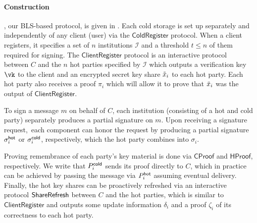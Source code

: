 
\paragraph{Construction}

\newcommand{\corrc}[1]{\textcolor{blue}{#1}}



\sysname, our BLS-based \hcwl protocol, is given in . Each cold storage is set up separately and independently of any client (user) via the $\mathsf{ColdRegister}$ protocol. When a client registers, it specifies a set of $n$ institutions $\mathcal{I}$ and a threshold $t \leq n$ of them required for signing. The $\mathsf{ClientRegister}$ protocol is an interactive protocol between $C$ and the $n$ hot parties specified by $\mathcal{I}$ which outputs a verification key $\vk$ to the client and an encrypted secret key share $\tilde{x}_i$ to each hot party. Each hot party also receives a proof $\pi_i$ which will allow it to prove that $\tilde{x}_i$ was the output of $\mathsf{ClientRegister}$.

To sign a message $m$ on behalf of $C$, each institution (consisting of a hot and cold party) separately produces a partial signature on $m$. Upon receiving a signature request,\footnotemark\ each component can honor the request by producing a partial signature $\sigma_i^{\mathsf{hot}}$ or $\sigma_i^{\mathsf{cold}}$, respectively, which the hot party combines into $\sigma_i$.

Proving remembrance of each party's key material is done via $\mathsf{CProof}$ and $\mathsf{HProof}$, respectively. We write that $P_i^{\mathsf{cold}}$ sends its proof directly to $C$, which in practice can be achieved by passing the message via $P_i^{\mathsf{hot}}$ assuming eventual delivery.
Finally, the hot key shares can be proactively refreshed via an interactive protocol $\mathsf{ShareRefresh}$ between $C$ and the hot parties, which is similar to $\mathsf{ClientRegister}$ and outputs some update information $\delta_i$ and a proof $\zeta_i$ of its correctness to each hot party.

